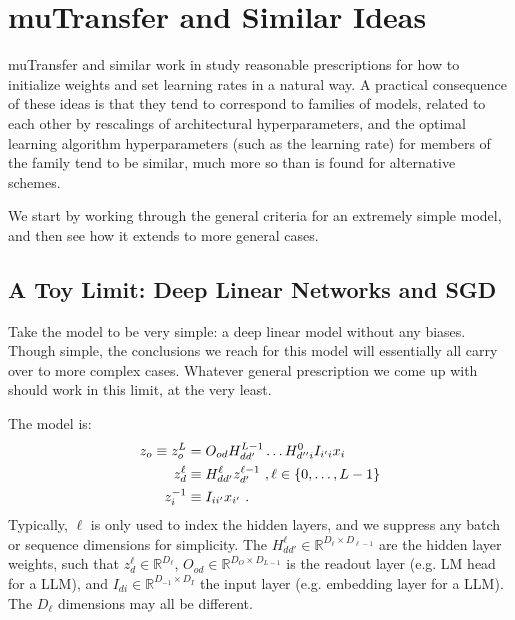 \documentclass[11pt]{article}
\begin{document}
\section{muTransfer and Similar Ideas}


muTransfer \cite{yang2022tensor} and similar work in \cite{physicalDL,
yaida2022metaprincipledfamilyhyperparameterscaling,doshi2023criticalinitializationwidedeep} study
reasonable prescriptions for how to initialize weights and set learning rates in a natural way. A
practical consequence of these ideas is that they tend to correspond to families of models, related
to each other by rescalings of architectural hyperparameters, and the optimal learning algorithm
hyperparameters (such as the learning rate) for members of the family tend to be similar, much more
so than is found for alternative schemes.

We start by working through the general criteria for an extremely simple model, and then see how it
extends to more general cases.


\subsection{A Toy Limit: Deep Linear Networks and SGD\label{app_mup_toy_limit}}

Take the model to be very simple: a deep linear model without any biases.  Though simple, the
conclusions we reach for this model will essentially all carry over to more complex cases. Whatever
general prescription we come up with should work in this limit, at the very least.

The model is:
\begin{align}
    z _{ o } \equiv  z ^{ L }_{ o } &= O _{ od } H ^{ L-1 }_{ d d' } \ldots H ^{ 0 } _{ d'' i }I _{ i 'i } x _{ i } \nonumber\\
    z ^{ \ell }_{ d } & \equiv H ^{ \ell }_{ d d' } z ^{ \ell-1 }_{ d' }  \ , \ell \in \left \{ 0, \ldots , L-1 \right \}\nonumber\\
    z ^{-1}_{ i } & \equiv I _{ i i' } x _{ i' }  \ . \label{app_eq_deep_linear_model}
\end{align}
Typically, $ \ell $ is only used to index the hidden layers, and we suppress any batch or sequence
dimensions for simplicity. The $ H ^{ \ell } _{ d d' } \in \mathbb{R} ^{ D _{ \ell  } \times D  _{
\ell-1 } } $  are the hidden layer weights, such that $ z_{ d }^{ \ell }\in \mathbb{R}^{ D_{
\ell } } $,  $O _{ o d } \in \mathbb{R} ^{ D _{O}\times D  _{ L-1 } } $ is the readout layer
(e.g. LM head for a LLM), and $I  _{ d i } \in \mathbb{R} ^{ D _{ -1} \times D  _{I} } $ the
input layer (e.g. embedding layer for a LLM). The $ D_{ \ell } $ dimensions may all be different.
\end{document}
